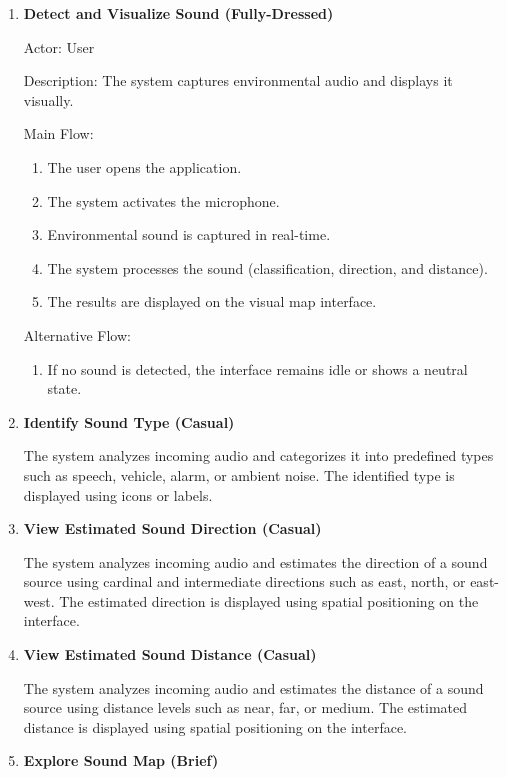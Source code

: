 \begin{enumerate}[leftmargin=80pt]

\item \textbf{Detect and Visualize Sound (Fully-Dressed)}

Actor: User

Description: The system captures environmental audio and displays it visually.

Main Flow:
\begin{enumerate}[leftmargin=80pt]
    \item The user opens the application.
    \item The system activates the microphone.
    \item Environmental sound is captured in real-time.
    \item The system processes the sound (classification, direction, and distance).
    \item The results are displayed on the visual map interface.
\end{enumerate}

Alternative Flow:
\begin{enumerate}[leftmargin=80pt]
    \item If no sound is detected, the interface remains idle or shows a neutral state.
\end{enumerate}

\item \textbf{Identify Sound Type (Casual)}

The system analyzes incoming audio and categorizes it into predefined types such as speech, vehicle, alarm, or ambient noise. The identified type is displayed using icons or labels.

\item \textbf{View Estimated Sound Direction (Casual)}

The system analyzes incoming audio and estimates the direction of a sound source using cardinal and intermediate directions such as east, north, or east-west. The estimated direction is displayed using spatial positioning on the interface.

\item \textbf{View Estimated Sound Distance (Casual)}

The system analyzes incoming audio and estimates the distance of a sound source using distance levels such as near, far, or medium. The estimated distance is displayed using spatial positioning on the interface.

\item \textbf{Explore Sound Map (Brief)}


\end{enumerate}
